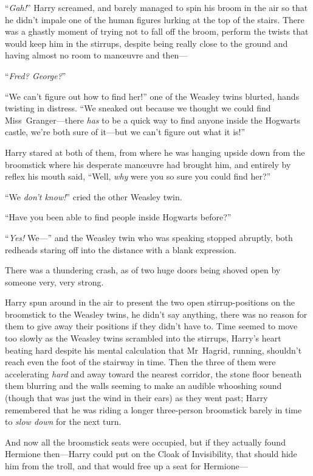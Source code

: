 “\emph{Gah!}” Harry screamed, and barely managed to spin his broom in the air so that he didn’t impale one of the human figures lurking at the top of the stairs. There was a ghastly moment of trying not to fall off the broom, perform the twists that would keep him in the stirrups, despite being really close to the ground and having almost no room to manœuvre and then—

“\emph{Fred? George?}”

“We can’t figure out how to find her!” one of the Weasley twins blurted, hands twisting in distress. “We sneaked out because we thought we could find Miss~Granger—there \emph{has} to be a quick way to find anyone inside the Hogwarts castle, we’re both sure of it—but we can’t figure out what it is!”

Harry stared at both of them, from where he was hanging upside down from the broomstick where his desperate manœuvre had brought him, and entirely by reflex his mouth said, “Well, \emph{why} were you so sure you could find her?”

“We \emph{don’t know!}” cried the other Weasley twin.

“Have you been able to find people inside Hogwarts before?”

“\emph{Yes!} We—” and the Weasley twin who was speaking stopped abruptly, both redheads staring off into the distance with a blank expression.

There was a thundering crash, as of two huge doors being shoved open by someone very, very strong.

Harry spun around in the air to present the two open stirrup-positions on the broomstick to the Weasley twins, he didn’t say anything, there was no reason for them to give away their positions if they didn’t have to. Time seemed to move too slowly as the Weasley twins scrambled into the stirrups, Harry’s heart beating hard despite his mental calculation that Mr~Hagrid, running, shouldn’t reach even the foot of the stairway in time. Then the three of them were accelerating \emph{hard} and away toward the nearest corridor, the stone floor beneath them blurring and the walls seeming to make an audible whooshing sound (though that was just the wind in their ears) as they went past; Harry remembered that he was riding a longer three-person broomstick barely in time to \emph{slow down} for the next turn.

And now all the broomstick seats were occupied, but if they actually found Hermione then—Harry could put on the Cloak of Invisibility, that should hide him from the troll, and that would free up a seat for Hermione—

